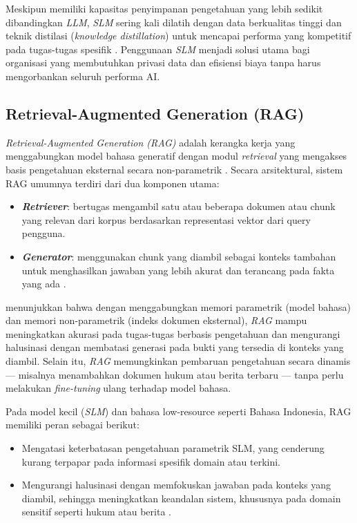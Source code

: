Meskipun memiliki kapasitas penyimpanan pengetahuan yang lebih sedikit dibandingkan \textit{LLM}, \textit{SLM} sering kali dilatih dengan data berkualitas tinggi dan teknik distilasi (\textit{knowledge distillation}) untuk mencapai performa yang kompetitif pada tugas-tugas spesifik \citep{xu2024surveyknowledgedistillationlarge}. Penggunaan \textit{SLM} menjadi solusi utama bagi organisasi yang membutuhkan privasi data dan efisiensi biaya tanpa harus mengorbankan seluruh performa AI.

\subsection{Retrieval-Augmented Generation (RAG)}
\textit{Retrieval-Augmented Generation (RAG)} adalah kerangka kerja yang menggabungkan model bahasa generatif dengan modul \textit{retrieval} yang mengakses basis pengetahuan eksternal secara non-parametrik \citep{lewis2020rag}. Secara arsitektural, sistem RAG umumnya terdiri dari dua komponen utama:

\begin{itemize}
    \item \textbf{\textit{Retriever}}: bertugas mengambil satu atau beberapa dokumen atau chunk yang relevan dari korpus berdasarkan representasi vektor dari query pengguna. 
    \item \textbf{\textit{Generator}}: menggunakan chunk yang diambil sebagai konteks tambahan untuk menghasilkan jawaban yang lebih akurat dan terancang pada fakta yang ada \citep{lewis2020rag}. 
\end{itemize}

\cite{lewis2020rag} menunjukkan bahwa dengan menggabungkan memori parametrik (model bahasa) dan memori non-parametrik (indeks dokumen eksternal), \textit{RAG} mampu meningkatkan akurasi pada tugas-tugas berbasis pengetahuan dan mengurangi halusinasi dengan membatasi generasi pada bukti yang tersedia di konteks yang diambil. Selain itu, \textit{RAG} memungkinkan pembaruan pengetahuan secara dinamis — misalnya menambahkan dokumen hukum atau berita terbaru — tanpa perlu melakukan \textit{fine-tuning} ulang terhadap model bahasa.

Pada  model kecil (\textit{SLM}) dan bahasa low-resource seperti Bahasa Indonesia, RAG memiliki peran sebagai berikut: 

\begin{itemize}
    \item Mengatasi keterbatasan pengetahuan parametrik SLM, yang cenderung kurang terpapar pada informasi spesifik domain atau terkini.
    \item Mengurangi halusinasi dengan memfokuskan jawaban pada konteks yang diambil, sehingga meningkatkan keandalan sistem, khususnya pada domain sensitif seperti hukum atau berita \citep{zhu2026bestpractices,reuter2025legalrag}.
\end{itemize}

